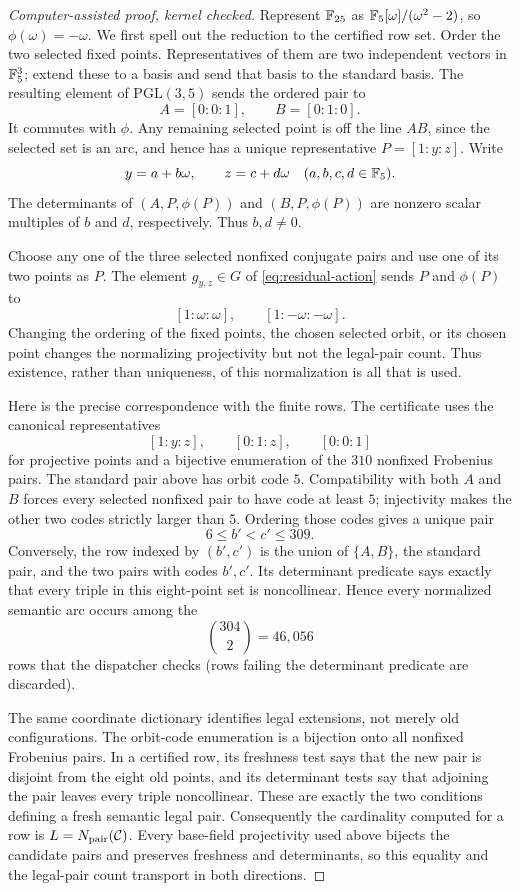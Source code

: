 \begin{proof}[Computer-assisted proof, kernel checked]
Represent $\mathbb{F}_{25}$ as $\mathbb{F}_5[\omega]/(\omega^2-2)$, so
$\phi(\omega)=-\omega$.  We first spell out the reduction to the certified
row set.  Order the two selected fixed points.  Representatives of them are
two independent vectors in $\mathbb{F}_5^3$; extend these to a basis and send that
basis to the standard basis.  The resulting element of
$\mathrm{PGL}(3,5)$ sends the ordered pair to
\[
 A=[0:0:1],\qquad B=[0:1:0].
\]
It commutes with $\phi$.  Any remaining selected point is off the line
$AB$, since the selected set is an arc, and hence has a unique representative
$P=[1:y:z]$.  Write
\[
 y=a+b\omega,\qquad z=c+d\omega
 \quad(a,b,c,d\in\mathbb{F}_5).
\]
The determinants of $(A,P,\phi(P))$ and $(B,P,\phi(P))$ are nonzero scalar
multiples of $b$ and $d$, respectively.  Thus $b,d\ne0$.

Choose any one of the three selected nonfixed conjugate pairs and use one of
its two points as $P$.  The element $g_{y,z}\in G$ of
\eqref{eq:residual-action} sends $P$ and $\phi(P)$ to
\[
 [1:\omega:\omega],\qquad[1:-\omega:-\omega].
\]
Changing the ordering of the fixed points, the chosen selected orbit, or its
chosen point changes the normalizing projectivity but not the legal-pair
count.  Thus existence, rather than uniqueness, of this normalization is all
that is used.

Here is the precise correspondence with the finite rows.  The certificate
uses the canonical representatives
\[
 [1:y:z],\qquad [0:1:z],\qquad [0:0:1]
\]
for projective points and a bijective enumeration of the $310$ nonfixed
Frobenius pairs.  The standard pair above has orbit code $5$.  Compatibility
with both $A$ and $B$ forces every selected nonfixed pair to have code at
least $5$; injectivity makes the other two codes strictly larger than $5$.
Ordering those codes gives a unique pair
\[
  6\le b'<c'\le309.
\]
Conversely, the row indexed by $(b',c')$ is the union of $\{A,B\}$, the
standard pair, and the two pairs with codes $b',c'$.  Its determinant
predicate says exactly that every triple in this eight-point set is
noncollinear.  Hence every normalized semantic arc occurs among the
\[
 \binom{304}{2}=46{,}056
\]
rows that the dispatcher checks (rows failing the determinant predicate are
discarded).

The same coordinate dictionary identifies legal extensions, not merely old
configurations.  The orbit-code enumeration is a bijection onto all nonfixed
Frobenius pairs.  In a certified row, its freshness test says that the new
pair is disjoint from the eight old points, and its determinant tests say
that adjoining the pair leaves every triple noncollinear.  These are exactly
the two conditions defining a fresh semantic legal pair.  Consequently the
cardinality computed for a row is $L=N_{\mathrm{pair}}(\mathcal{C})$.  Every base-field
projectivity used above bijects the candidate pairs and preserves freshness
and determinants, so this equality and the legal-pair count transport in
both directions.


\end{proof}

